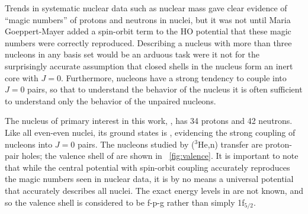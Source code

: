 Trends in systematic nuclear data such as nuclear mass gave clear evidence of ``magic numbers'' of protons and neutrons in nuclei, but it was not until Maria Goeppert-Mayer added a spin-orbit term to the HO potential that these magic numbers were correctly reproduced.  Describing a nucleus with more than three nucleons in any basis set would be an arduous task were it not for the surprisingly accurate assumption that closed shells in the nucleus form an inert core with $J=0$.  Furthermore, nucleons have a strong tendency to couple into $J=0$ pairs, so that to understand the behavior of the nucleus it is often sufficient to understand only the behavior of the unpaired nucleons.

The nucleus of primary interest in this work, , has 34 protons and 42 neutrons.  Like all even-even nuclei, its ground states is \zp, evidencing the strong coupling of nucleons into $J=0$ pairs.  The nucleons studied by ($^3$He,n) transfer are proton-pair holes; the valence shell of \GeTargets are shown in {\fig}~\ref{fig:valence}.  It is important to note that while the central potential with spin-orbit coupling accurately reproduces the magic numbers seen in nuclear data, it is by no means a universal potential that accurately describes all nuclei.  The exact energy levels in \GeTargets are not known, and so the valence shell is considered to be f-p-g rather than simply 1f$_{5/2}$.

